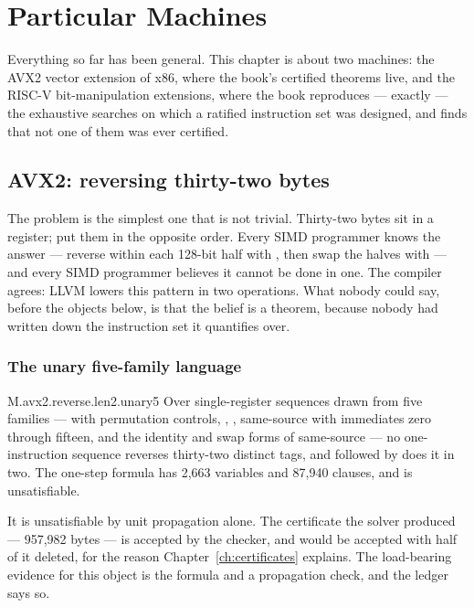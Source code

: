 \chapter{Particular Machines}
\label{ch:machines}

Everything so far has been general. This chapter is about two machines: the AVX2 vector extension of x86, where the book's certified theorems live, and the RISC-V bit-manipulation extensions, where the book reproduces --- exactly --- the exhaustive searches on which a ratified instruction set was designed, and finds that not one of them was ever certified.

\section{AVX2: reversing thirty-two bytes}
\label{sec:avx2}

The problem is the simplest one that is not trivial. Thirty-two bytes sit in a register; put them in the opposite order. Every SIMD programmer knows the answer --- reverse within each 128-bit half with , then swap the halves with  --- and every SIMD programmer believes it cannot be done in one. The compiler agrees: LLVM lowers this pattern in two operations. What nobody could say, before the objects below, is that the belief is a theorem, because nobody had written down the instruction set it quantifies over.

\subsection{The unary five-family language}

\begin{artifact}{M.avx2.reverse.len2.unary5}
Over single-register sequences drawn from five families ---  with permutation controls, , , same-source  with immediates zero through fifteen, and the identity and swap forms of same-source  --- no one-instruction sequence reverses thirty-two distinct tags, and  followed by  does it in two. The one-step formula has 2,663 variables and 87,940 clauses, and is unsatisfiable.

It is unsatisfiable by unit propagation alone. The certificate the solver produced --- 957,982 bytes --- is accepted by the checker, and would be accepted with half of it deleted, for the reason Chapter~\ref{ch:certificates} explains. The load-bearing evidence for this object is the formula and a propagation check, and the ledger says so.
\end{artifact}

